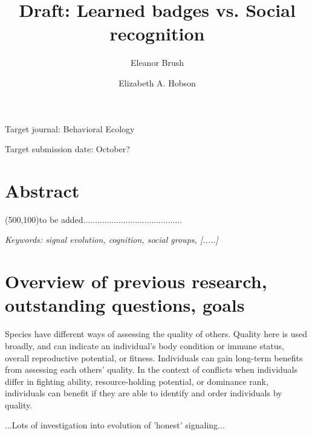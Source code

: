 

\noindent
\title{Draft: Learned badges vs. Social recognition} 

\author[1]{Eleanor Brush}
\author[2,3,4]{Elizabeth A. Hobson}
\maketitle

Target journal: Behavioral Ecology 

Target submission date: October?
\linenumbers

\section*{Abstract}

\framebox(500,100){to be added..........................................}

\textit{Keywords: signal evolution, cognition, social groups, [.....]}
\newline

\section*{Overview of previous research, outstanding questions, goals} 

Species have different ways of assessing the quality of others. Quality here is used broadly, and can indicate an individual's body condition or immune status, overall reproductive potential, or fitness. Individuals can gain long-term benefits from assessing each others' quality. In the context of conflicts when individuals differ in fighting ability, resource-holding potential, or dominance rank, individuals can benefit if they are able to identify and order individuals by quality. 

...Lots of investigation into evolution of 'honest' signaling...  


